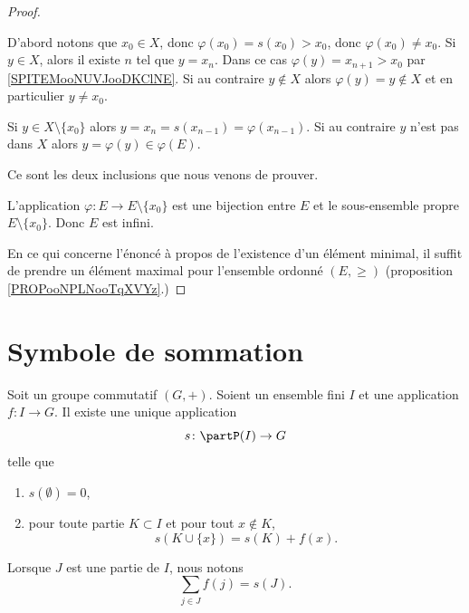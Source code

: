 \begin{proof}
\begin{subproof}
		D'abord notons que \( x_0\in X\), donc \( \varphi(x_0)=s(x_0)>x_0\), donc \( \varphi(x_0)\neq x_0\). Si \( y\in X\), alors il existe \( n\) tel que \( y=x_n\). Dans ce cas \( \varphi(y)=x_{n+1}>x_0\) par \ref{SPITEMooNUVJooDKClNE}. Si au contraire \( y\not\in X\) alors \( \varphi(y)=y\not\in X\) et en particulier \( y\neq x_0\).

		Si \( y\in X\setminus\{ x_0 \}\) alors \( y=x_n=s(x_{n-1})=\varphi(x_{n-1})\). Si au contraire \( y\) n'est pas dans \( X\) alors \( y=\varphi(y)\in \varphi(E)\).

		\spitem[\( E\setminus\{ x_0 \}=\varphi(E)\)]
		Ce sont les deux inclusions que nous venons de prouver.

		\spitem[Conclusion]
		L'application \(\varphi \colon E\to E\setminus\{ x_0 \}  \) est une bijection entre \( E\) et le sous-ensemble propre \( E\setminus\{ x_0 \}\). Donc \( E\) est infini.
	\end{subproof}

	En ce qui concerne l'énoncé à propos de l'existence d'un élément minimal, il suffit de prendre un élément maximal pour l'ensemble ordonné \( (E,\geq)\) (proposition \ref{PROPooNPLNooTqXVYz}.)
\end{proof}


\section{Symbole de sommation}


\begin{propositionDef}	\label{PROPooDUSJooWNyqWm}
	Soit un groupe commutatif \( (G,+)\). Soient un ensemble fini \( I\) et une application \(f \colon I\to G  \). Il existe une unique application
	\begin{equation}
		s \colon \partP(I)\to G
	\end{equation}
	telle que
	\begin{enumerate}
		\item
		      \( s(\emptyset)=0\),
		\item
		      pour toute partie \( K\subset I\) et pour tout \( x\not\in K\),
		      \begin{equation}
			      s(K\cup\{ x \})=s(K)+f(x).
		      \end{equation}
	\end{enumerate}
	Lorsque \( J\) est une partie de \( I\), nous notons
	\begin{equation}		\label{EQooDVYXooEoNUiF}
		\sum_{j\in J}f(j)=s(J).
	\end{equation}
\end{propositionDef}

